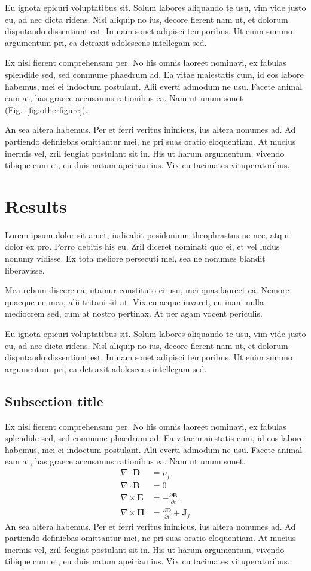 \documentclass[10pt,onecolumn]{article}
\newcommand{\Div}{\nabla\cdot}
\newcommand{\Curl}{\nabla\times}
\newcommand{\vecE}{\mathbf{E}}
\newcommand{\vecB}{\mathbf{B}}
\newcommand{\vecD}{\mathbf{D}}
\newcommand{\vecH}{\mathbf{H}}
\newcommand{\vecJ}{\mathbf{J}}
\begin{document}
Eu ignota epicuri voluptatibus sit. Solum labores aliquando te usu, vim vide justo eu, ad nec dicta ridens. Nisl aliquip no ius, decore fierent nam ut, et dolorum disputando dissentiunt est. In nam sonet adipisci temporibus. Ut enim summo argumentum pri, ea detraxit adolescens intellegam sed.

Ex nisl fierent comprehensam per. No his omnis laoreet nominavi, ex fabulas splendide sed, sed commune phaedrum ad. Ea vitae maiestatis cum, id eos labore habemus, mei ei indoctum postulant. Alii everti admodum ne usu. Facete animal eam at, has graece accusamus rationibus ea. Nam ut unum sonet (Fig.~\ref{fig:otherfigure}).

An sea altera habemus. Per et ferri veritus inimicus, ius altera nonumes ad. Ad partiendo definiebas omittantur mei, ne pri suas oratio eloquentiam. At mucius inermis vel, zril feugiat postulant sit in. His ut harum argumentum, vivendo tibique cum et, eu duis natum apeirian ius. Vix cu tacimates vituperatoribus.
%
\section{Results}
%
Lorem ipsum dolor sit amet, iudicabit posidonium theophrastus ne nec, atqui dolor ex pro. Porro debitis his eu. Zril diceret nominati quo ei, et vel ludus nonumy vidisse. Ex tota meliore persecuti mel, sea ne nonumes blandit liberavisse.

Mea rebum discere ea, utamur constituto ei usu, mei quas laoreet ea. Nemore quaeque ne mea, alii tritani sit at. Vix eu aeque iuvaret, cu inani nulla mediocrem sed, cum at nostro pertinax. At per agam vocent periculis.

Eu ignota epicuri voluptatibus sit. Solum labores aliquando te usu, vim vide justo eu, ad nec dicta ridens. Nisl aliquip no ius, decore fierent nam ut, et dolorum disputando dissentiunt est. In nam sonet adipisci temporibus. Ut enim summo argumentum pri, ea detraxit adolescens intellegam sed.
%
\subsection{Subsection title}
%
Ex nisl fierent comprehensam per. No his omnis laoreet nominavi, ex fabulas splendide sed, sed commune phaedrum ad. Ea vitae maiestatis cum, id eos labore habemus, mei ei indoctum postulant. Alii everti admodum ne usu. Facete animal eam at, has graece accusamus rationibus ea. Nam ut unum sonet.
%
\begin{equation}
\begin{aligned} 
\Div\vecD &= \rho_f\\
\Div\vecB &= 0\\
\Curl\vecE &= -\frac{\partial\vecB}{\partial t}\\
\Curl\vecH &= \frac{\partial\vecD}{\partial t} + \vecJ_f
\end{aligned}
\label{eq2}
\end{equation}
%
An sea altera habemus. Per et ferri veritus inimicus, ius altera nonumes ad. Ad partiendo definiebas omittantur mei, ne pri suas oratio eloquentiam. At mucius inermis vel, zril feugiat postulant sit in. His ut harum argumentum, vivendo tibique cum et, eu duis natum apeirian ius. Vix cu tacimates vituperatoribus.
%
\end{document}
